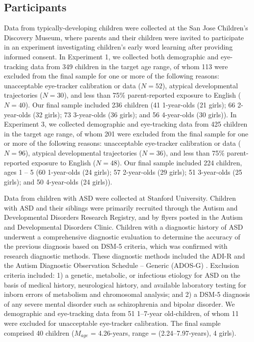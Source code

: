 \documentclass{pnastwo}
\begin{document}
\begin{article}
\begin{materials}
\subsection{Participants} Data from typically-developing children were collected at the San Jose Children's Discovery Museum, where parents and their children were invited to participate in an experiment investigating children's early word learning after providing informed consent. In Experiment 1, we collected both demographic and eye-tracking data from 349 children in the target age range, of whom 113 were excluded from the final sample for one or more of the following reasons: unacceptable eye-tracker calibration or data ($N=52$), atypical developmental trajectories ($N=30$), and less than 75\% parent-reported exposure to English ($N=40$). Our final sample included 236 children (41 1-year-olds (21 girls); 66 2-year-olds (32 girls); 73 3-year-olds (36 girls); and 56 4-year-olds (30 girls)). In Experiment 3, we collected demographic and eye-tracking data from 425 children in the target age range, of whom 201 were excluded from the final sample for one or more of the following reasons: unacceptable eye-tracker calibration or data ($N=96$), atypical developmental trajectories ($N=36$), and less than 75\% parent-reported exposure to English ($N=48$). Our final sample included 224 children, ages 1 -- 5 (60 1-year-olds (24 girls); 57 2-year-olds (29 girls); 51 3-year-olds (25 girls); and 50 4-year-olds (24 girls)).

Data from children with ASD were collected at Stanford University. Children with ASD and their siblings were primarily recruited through the Autism and Developmental Disorders Research Registry, and by flyers posted in the Autism and Developmental Disorders Clinic. Children with a diagnostic history of ASD underwent a comprehensive diagnostic evaluation to determine the accuracy of the previous diagnosis based on DSM-5 criteria, which was confirmed with research diagnostic methods. These diagnostic methods included the ADI-R \citep{lord1994,le-couter1989} and the Autism Diagnostic Observation Schedule -- Generic (ADOS-G) \citep{lord1999,lord2000}. Exclusion criteria included: 1) a genetic, metabolic, or infectious etiology for ASD on the basis of medical history, neurological history, and available laboratory testing for inborn errors of metabolism and chromosomal analysis; and 2) a DSM-5 diagnosis of any severe mental disorder such as schizophrenia and bipolar disorder. We demographic and eye-tracking data from 51 1--7-year old-children, of whom 11 were excluded for unacceptable eye-tracker calibration. The final sample comprised 40 children ($M_{age}$ = 4.26-years, range = (2.24--7.97-years), 4 girls). 


\end{materials}
\end{article}
\end{document}
